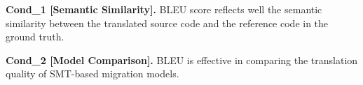 
{\bf Cond\_1 [Semantic Similarity].} BLEU score reflects well the
semantic similarity between the translated source code and the
reference code in the ground truth.

{\bf Cond\_2 [Model Comparison].} BLEU is effective in comparing the
translation quality of SMT-based migration models.




